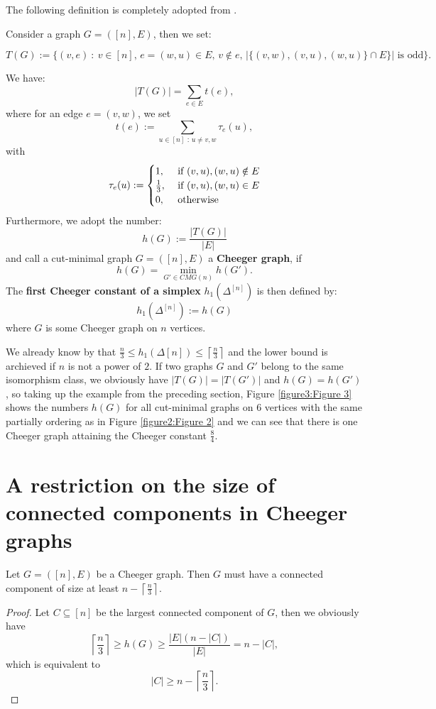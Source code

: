 The following definition is completely adopted from \cite{1}.
\begin{defi}\label{definition1}
Consider a graph \(G=([n],E)\), then we set:
\begin{small}
\[
T(G):=\{(v,e)\: :\: v\in [n]\text{, }e=(w,u)\in E\text{, }v\notin e\text{, }|\{(v,w),(v,u),(w,u)\}\cap E\}|\text{ is odd}\}.
\]
\end{small}
We have:
\[
|T(G)|=\sum\limits_{e\in E}t(e),
\]
where for an edge \(e=(v,w)\), we set
\[
t(e):=\sum\limits_{u\in[n]\text{ : }u\neq v,w}\tau_e(u),
\]
with
\begin{equation}
\tau_e(u):=
\begin{cases}
1,&\text{ if }(v,u),(w,u)\notin E\notag\\
\frac{1}{3},&\text{ if }(v,u),(w,u)\in E\notag\\
0,&\text{ otherwise}\notag
\end{cases}
\end{equation}
Furthermore, we adopt the number:
\[
h(G):=\frac{|T(G)|}{|E|}
\]
and call a cut-minimal graph \(G=([n],E)\) a \textbf{Cheeger graph}, if
\[
h(G)=\min\limits_{G'\in CMG(n)}h(G').
\]
The \textbf{first Cheeger constant of a simplex} \(h_1(\Delta^{[n]})\) is then defined by:
\[
h_1(\Delta^{[n]}):=h(G)
\]
where \(G\) is some Cheeger graph on \(n\) vertices.
\end{defi}
We already know by \cite{1} that \(\frac{n}{3}\leq h_1(\Delta{[n]})\leq\left\lceil\frac{n}{3}\right\rceil\) and the lower bound is archieved if \(n\) is not a power of \(2\). If two graphs \(G\) and \(G'\) belong to the same isomorphism class, we obviously have \(|T(G)|=|T(G')|\) and \(h(G)=h(G')\), so taking up the example from the preceding section, Figure \ref{figure3:Figure 3} shows the numbers \(h(G)\) for all cut-minimal graphs on \(6\) vertices with the same partially ordering as in Figure \ref{figure2:Figure 2} and we can see that there is one Cheeger graph attaining the Cheeger constant \(\frac{8}{4}\).



\section{A restriction on the size of connected components in Cheeger graphs}

\begin{prop}
Let \(G=([n],E)\) be a Cheeger graph. Then \(G\) must have a connected component of size at least \(n-\left\lceil\frac{n}{3}\right\rceil\).
\begin{proof}
Let \(C\subseteq [n]\) be the largest connected component of \(G\), then we obviously have
\[
\left\lceil\frac{n}{3}\right\rceil\geq h(G)\geq \frac{|E|(n-|C|)}{|E|}=n-|C|,
\]
which is equivalent to
\[
|C|\geq n-\left\lceil\frac{n}{3}\right\rceil.
\]
\end{proof}
\end{prop}


